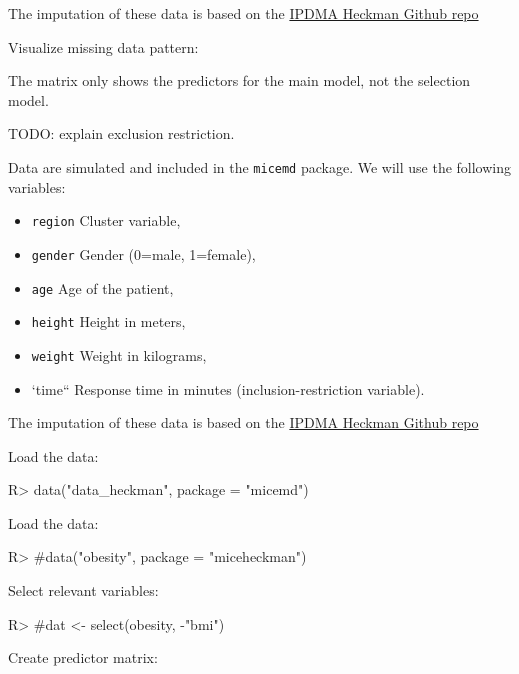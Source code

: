 \documentclass[
]{jss}
\providecommand{\tightlist}{%
  \setlength{\itemsep}{0pt}\setlength{\parskip}{0pt}}
\begin{document}
The imputation of these data is based on the
\href{https://github.com/johamunoz/Heckman-IPDMA/blob/main/Toy_example.R}{IPDMA
Heckman Github repo}

Visualize missing data pattern:

The matrix only shows the predictors for the main model, not the
selection model.

TODO: explain exclusion restriction.

Data are simulated and included in the \texttt{micemd} package. We will
use the following variables:

\begin{itemize}
\tightlist
\item
  \texttt{region} Cluster variable,
\item
  \texttt{gender} Gender (0=male, 1=female),
\item
  \texttt{age} Age of the patient,
\item
  \texttt{height} Height in meters,
\item
  \texttt{weight} Weight in kilograms,
\item
  `time`` Response time in minutes (inclusion-restriction variable).
\end{itemize}

The imputation of these data is based on the
\href{https://github.com/johamunoz/Heckman-IPDMA/blob/main/Toy_example.R}{IPDMA
Heckman Github repo}

Load the data:

\begin{CodeChunk}
\begin{CodeInput}
R> data("data_heckman", package = "micemd")
\end{CodeInput}
\end{CodeChunk}

Load the data:

\begin{CodeChunk}
\begin{CodeInput}
R> #data("obesity", package = "miceheckman")
\end{CodeInput}
\end{CodeChunk}

Select relevant variables:

\begin{CodeChunk}
\begin{CodeInput}
R> #dat <- select(obesity, -"bmi")
\end{CodeInput}
\end{CodeChunk}

Create predictor matrix:
\end{document}
